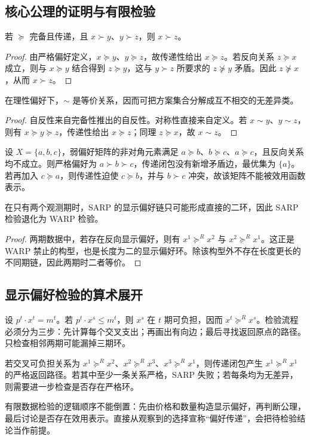 \subsection{核心公理的证明与有限检验}

\begin{proposition}[严格偏好的传递性]
若 $\succeq$ 完备且传递，且 $x\succ y$、$y\succ z$，则 $x\succ z$。
\end{proposition}
\begin{proof}
由严格偏好定义，$x\succeq y$、$y\succeq z$，故传递性给出 $x\succeq z$。若反向关系 $z\succeq x$ 成立，则与 $x\succeq y$ 结合得到 $z\succeq y$，这与 $y\succ z$ 所要求的 $z\not\succeq y$ 矛盾。因此 $z\not\succeq x$，从而 $x\succ z$。
\end{proof}

\begin{proposition}[无差异关系的等价性]
在理性偏好下，$\sim$ 是等价关系，因而可把方案集合分解成互不相交的无差异类。
\end{proposition}
\begin{proof}
自反性来自完备性推出的自反性。对称性直接来自定义。若 $x\sim y$、$y\sim z$，则有 $x\succeq y\succeq z$，传递性给出 $x\succeq z$；同理 $z\succeq x$，故 $x\sim z$。
\end{proof}

\begin{example}[三方案矩阵的逐项检验]
设 $X=\{a,b,c\}$，弱偏好矩阵的非对角元素满足 $a\succeq b$、$b\succeq c$、$a\succeq c$，且反向关系均不成立。则严格偏好为 $a\succ b\succ c$，传递闭包没有新增矛盾边，最优集为 $\{a\}$。若再加入 $c\succeq a$，则传递性迫使 $c\succeq b$，并与 $b\succ c$ 冲突，故该矩阵不能被效用函数表示。
\end{example}

\begin{proposition}
在只有两个观测期时，SARP 的显示偏好链只可能形成直接的二环，因此 SARP 检验退化为 WARP 检验。
\end{proposition}
\begin{proof}
两期数据中，若存在反向显示偏好，则有 $x^1\succeq^Rx^2$ 与 $x^2\succeq^Rx^1$。这正是 WARP 禁止的构型，也是长度为二的显示偏好环。除该构型外不存在长度更长的不同期链，因此两期时二者等价。
\end{proof}

\subsection{显示偏好检验的算术展开}
设 $p^t\cdot x^t=m^t$。若 $p^t\cdot x^s\le m^t$，则 $x^s$ 在 $t$ 期可负担，因而 $x^t\succeq^Rx^s$。检验流程必须分为三步：先计算每个交叉支出；再画出有向边；最后寻找返回原点的路径。只检查相邻两期可能漏掉三期环。

\begin{example}[三期环的识别]
若交叉可负担关系为 $x^1\succeq^Rx^2$、$x^2\succeq^Rx^3$、$x^3\succeq^Rx^1$，则传递闭包产生 $x^1\succeq^Rx^1$ 的严格返回路径。若其中至少一条关系严格，SARP 失败；若每条均为无差异，则需要进一步检查是否存在严格环。
\end{example}

\begin{remark}
有限数据检验的逻辑顺序不能倒置：先由价格和数量构造显示偏好，再判断公理，最后讨论是否存在效用表示。直接从观察到的选择宣称“偏好传递”，会把待检验结论当作前提。
\end{remark}
